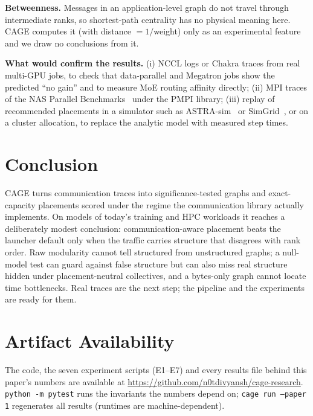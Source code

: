 \documentclass[conference]{IEEEtran}
\begin{document}
\textbf{Betweenness.} Messages in an application-level graph do not travel through intermediate
ranks, so shortest-path centrality has no physical meaning here. CAGE computes it
(with distance $=1/$weight) only as an experimental feature and we draw no conclusions from it.

\textbf{What would confirm the results.} (i) NCCL logs or Chakra traces from real multi-GPU jobs,
to check that data-parallel and Megatron jobs show the predicted ``no gain'' and to measure MoE
routing affinity directly; (ii) MPI traces of the NAS Parallel Benchmarks~\cite{bailey1991nas}
under the PMPI library; (iii) replay of recommended placements in a simulator such as
ASTRA-sim~\cite{rashidi2020astra} or SimGrid~\cite{casanova2014simgrid}, or on a cluster
allocation, to replace the analytic model with measured step times.

\section{Conclusion}
CAGE turns communication traces into significance-tested graphs and exact-capacity placements
scored under the regime the communication library actually implements. On models of today's
training and HPC workloads it reaches a deliberately modest conclusion: communication-aware
placement beats the launcher default only when the traffic carries structure that disagrees with
rank order. Raw modularity cannot tell structured from unstructured graphs; a null-model test can
guard against false structure but can also miss real structure hidden under placement-neutral
collectives, and a bytes-only graph cannot locate time bottlenecks. Real traces are the next step; the pipeline
and the experiments are ready for them.

\section*{Artifact Availability}\label{sec:artifact}
The code, the seven experiment scripts (E1--E7) and every results file behind this paper's
numbers are available at \url{https://github.com/n0tdivyansh/cage-research}. \texttt{python -m pytest} runs the invariants
the numbers depend on; \texttt{cage run --paper 1} regenerates all results (runtimes are
machine-dependent).



\end{document}
